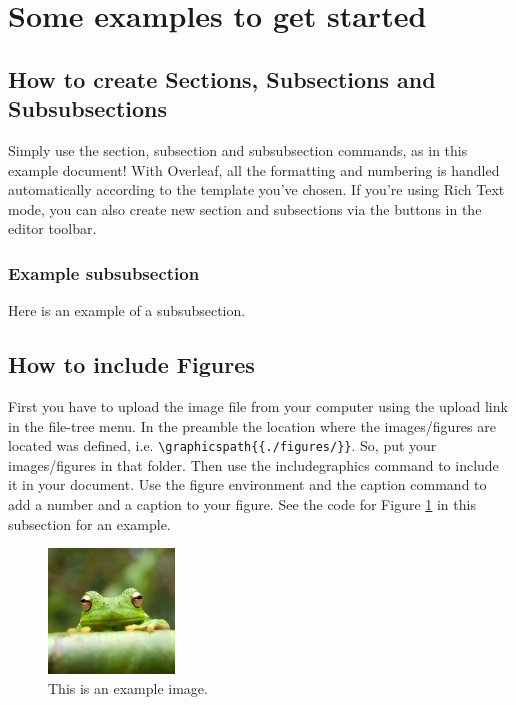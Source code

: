 \documentclass[12pt,a4paper,faculty=ea,language=en,doctype=article]{ugent-doc}
\begin{document}

\section{Some examples to get started}

\subsection{How to create Sections, Subsections and Subsubsections}

Simply use the section, subsection and subsubsection commands, as in this example document!
With Overleaf, all the formatting and numbering is handled automatically according to the template you've chosen.
If you're using Rich Text mode, you can also create new section and subsections via the buttons in the editor toolbar.

\subsubsection{Example subsubsection}

Here is an example of a subsubsection.

\subsection{How to include Figures}

First you have to upload the image file from your computer using the upload link in the file-tree menu.
In the preamble the location where the images/figures are located was defined, i.e. \verb|\graphicspath{{./figures/}}|.
So, put your images/figures in that folder.
Then use the includegraphics command to include it in your document.
Use the figure environment and the caption command to add a number and a caption to your figure.
See the code for Figure \ref{fig:frog} in this subsection for an example.

\begin{figure}[ht]
	\centering
	\includegraphics[width=0.3\textwidth]{frog.jpg}
	\caption{\label{fig:frog}This is an example image.}
\end{figure}
\end{document}
